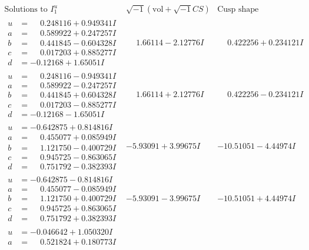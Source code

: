 \documentclass[1p]{elsarticle_modified}
\theoremstyle{definition}
\newcommand{\I}{\sqrt{-1}}
\begin{document}
$$\begin{array}{c|c|c}  
\text{Solutions to }I^u_{1}& \I (\text{vol} + \sqrt{-1}CS) & \text{Cusp shape}\\
 \hline 
\begin{aligned}
u &= \phantom{-}0.248116 + 0.949341 I \\
a &= \phantom{-}0.589922 + 0.247257 I \\
b &= \phantom{-}0.441845 - 0.604328 I \\
c &= \phantom{-}0.017203 + 0.885277 I \\
d &= -0.12168 + 1.65051 I\end{aligned}
 & \phantom{-}1.66114 - 2.12776 I & \phantom{-}0.422256 + 0.234121 I \\ \hline\begin{aligned}
u &= \phantom{-}0.248116 - 0.949341 I \\
a &= \phantom{-}0.589922 - 0.247257 I \\
b &= \phantom{-}0.441845 + 0.604328 I \\
c &= \phantom{-}0.017203 - 0.885277 I \\
d &= -0.12168 - 1.65051 I\end{aligned}
 & \phantom{-}1.66114 + 2.12776 I & \phantom{-}0.422256 - 0.234121 I \\ \hline\begin{aligned}
u &= -0.642875 + 0.814816 I \\
a &= \phantom{-}0.455077 + 0.085949 I \\
b &= \phantom{-}1.121750 - 0.400729 I \\
c &= \phantom{-}0.945725 - 0.863065 I \\
d &= \phantom{-}0.751792 - 0.382393 I\end{aligned}
 & -5.93091 + 3.99675 I & -10.51051 - 4.44974 I \\ \hline\begin{aligned}
u &= -0.642875 - 0.814816 I \\
a &= \phantom{-}0.455077 - 0.085949 I \\
b &= \phantom{-}1.121750 + 0.400729 I \\
c &= \phantom{-}0.945725 + 0.863065 I \\
d &= \phantom{-}0.751792 + 0.382393 I\end{aligned}
 & -5.93091 - 3.99675 I & -10.51051 + 4.44974 I \\ \hline\begin{aligned}
u &= -0.046642 + 1.050320 I \\
a &= \phantom{-}0.521824 + 0.180773 I \\

\end{aligned}
\end{array}$$
\end{document}
